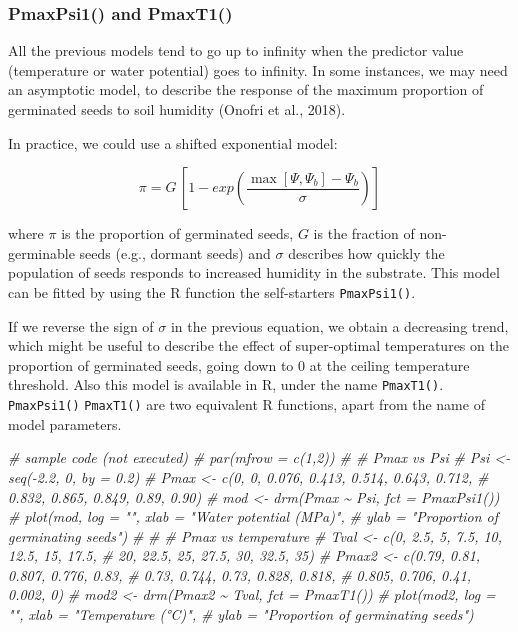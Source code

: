 \documentclass[
]{book}
\newenvironment{Shaded}{\begin{snugshade}}{\end{snugshade}}
\newcommand{\CommentTok}[1]{\textcolor[rgb]{0.56,0.35,0.01}{\textit{#1}}}
\begin{document}
\hypertarget{pmaxpsi1-and-pmaxt1}{%
\subsubsection{PmaxPsi1() and PmaxT1()}\label{pmaxpsi1-and-pmaxt1}}

All the previous models tend to go up to infinity when the predictor value (temperature or water potential) goes to infinity. In some instances, we may need an asymptotic model, to describe the response of the maximum proportion of germinated seeds to soil humidity (Onofri et al., 2018).

In practice, we could use a shifted exponential model:

\[ \pi = G \, \left[ 1 - exp \left( \frac{ \max\left[\Psi, \Psi_b\right] - \Psi_b }{\sigma} \right) \right]\]

where \(\pi\) is the proportion of germinated seeds, \(G\) is the fraction of non-germinable seeds (e.g., dormant seeds) and \(\sigma\) describes how quickly the population of seeds responds to increased humidity in the substrate. This model can be fitted by using the R function the self-starters \texttt{PmaxPsi1()}.

If we reverse the sign of \(\sigma\) in the previous equation, we obtain a decreasing trend, which might be useful to describe the effect of super-optimal temperatures on the proportion of germinated seeds, going down to 0 at the ceiling temperature threshold. Also this model is available in R, under the name \texttt{PmaxT1()}. \texttt{PmaxPsi1()} \texttt{PmaxT1()} are two equivalent R functions, apart from the name of model parameters.

\begin{Shaded}
\begin{Highlighting}[]
\CommentTok{\# sample code (not executed)}
\CommentTok{\# par(mfrow = c(1,2))}
\CommentTok{\# \# Pmax vs Psi}
\CommentTok{\# Psi \textless{}{-} seq({-}2.2, 0, by = 0.2)}
\CommentTok{\# Pmax \textless{}{-} c(0, 0, 0.076, 0.413, 0.514, 0.643, 0.712,}
\CommentTok{\#           0.832, 0.865, 0.849, 0.89, 0.90)}
\CommentTok{\# mod \textless{}{-} drm(Pmax \textasciitilde{} Psi, fct = PmaxPsi1())}
\CommentTok{\# plot(mod, log = "", xlab = "Water potential (MPa)", }
\CommentTok{\#      ylab = "Proportion of germinating seeds")}
\CommentTok{\# }
\CommentTok{\# \# Pmax vs temperature}
\CommentTok{\# Tval \textless{}{-} c(0, 2.5, 5, 7.5, 10, 12.5, 15, 17.5,}
\CommentTok{\#           20, 22.5, 25, 27.5, 30, 32.5, 35)}
\CommentTok{\# Pmax2 \textless{}{-} c(0.79, 0.81, 0.807, 0.776, 0.83,}
\CommentTok{\#            0.73, 0.744, 0.73, 0.828, 0.818,}
\CommentTok{\#            0.805, 0.706, 0.41, 0.002, 0)}
\CommentTok{\# mod2 \textless{}{-} drm(Pmax2 \textasciitilde{} Tval, fct = PmaxT1())}
\CommentTok{\# plot(mod2, log = "", xlab = "Temperature (°C)", }
\CommentTok{\#      ylab = "Proportion of germinating seeds")}
\end{Highlighting}
\end{Shaded}
\end{document}
